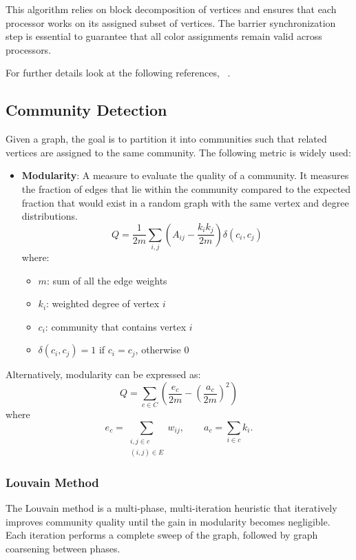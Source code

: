 \documentclass[12pt]{book}
\begin{document}
This algorithm relies on block decomposition of vertices and ensures that each processor works on its assigned subset of vertices. The barrier synchronization step is essential to guarantee that all color assignments remain valid across processors.

For further details look at the following references, ~\cite{yoo2005scalable,harish2007accelerating,luby1985simple,gebremedhin2000scalable}.

\subsection{Community Detection}
Given a graph, the goal is to partition it into communities such that related vertices are assigned to the same community.  
The following metric is widely used:

\begin{itemize}
    \item \textbf{Modularity}: A measure to evaluate the quality of a community. It measures the fraction of edges that lie within the community compared to the expected fraction that would exist in a random graph with the same vertex and degree distributions.
    \[
    Q = \frac{1}{2m} \sum_{i,j}\left(A_{ij} -\frac{k_i k_j}{2m}\right)\delta(c_i,c_j)
    \]
    where:
    \begin{itemize}
        \item $m$: sum of all the edge weights
        \item $k_i$: weighted degree of vertex $i$
        \item $c_i$: community that contains vertex $i$
        \item $\delta(c_i,c_j)=1$ if $c_i=c_j$, otherwise $0$
    \end{itemize}
\end{itemize}

Alternatively, modularity can be expressed as:
\[
Q=\sum_{c\in C}\left(\frac{e_c}{2m} - \left(\frac{a_c}{2m}\right)^2\right)
\]
where
\[
e_c = \sum_{\substack{i,j \in c \\ (i,j)\in E}} w_{ij}, 
\qquad a_c=\sum_{i\in c} k_i.
\]

\subsubsection{Louvain Method}
The Louvain method is a multi-phase, multi-iteration heuristic that iteratively improves community quality until the gain in modularity becomes negligible. Each iteration performs a complete sweep of the graph, followed by graph coarsening between phases.
\end{document}
